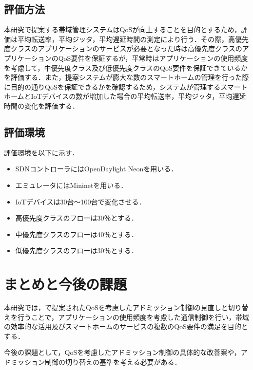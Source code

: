 \documentclass[a4paper,10pt,twocolumn,uplatex]{jsarticle}
\begin{document}
\subsection{評価方法}
本研究で提案する帯域管理システムはQoSが向上することを目的とするため，評価は平均転送率，平均ジッタ，平均遅延時間の測定により行う．その際，高優先度クラスのアプリケーションのサービスが必要となった時は高優先度クラスのアプリケーションのQoS要件を保証するが，平常時はアプリケーションの使用頻度を考慮して，中優先度クラス及び低優先度クラスのQoS要件を保証できているかを評価する．また，提案システムが膨大な数のスマートホームの管理を行った際に目的の通りQoSを保証できるかを確認するため，システムが管理するスマートホームとIoTデバイスの数が増加した場合の平均転送率，平均ジッタ，平均遅延時間の変化を評価する．\par

\subsection{評価環境}
評価環境を以下に示す．\par

\begin{itemize}
  \item SDNコントローラにはOpenDaylight Neonを用いる．
  \item エミュレータにはMininetを用いる．
  \item IoTデバイスは30台〜100台で変化させる．
  \item 高優先度クラスのフローは30％とする．
  \item 中優先度クラスのフローは40％とする．
  \item 低優先度クラスのフローは30％とする．
\end{itemize}

\section{まとめと今後の課題}
本研究では，\cite{AQRA}で提案されたQoSを考慮したアドミッション制御の見直しと切り替えを行うことで，アプリケーションの使用頻度を考慮した通信制御を行い，帯域の効率的な活用及びスマートホームのサービスの複数のQoS要件の満足を目的とする．\par
今後の課題として，QoSを考慮したアドミッション制御の具体的な改善案や，アドミッション制御の切り替えの基準を考える必要がある．\par
\end{document}
